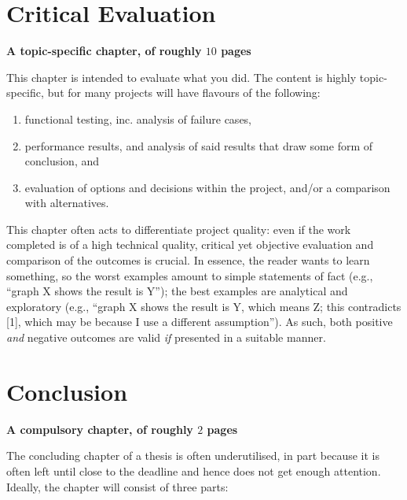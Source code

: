 \documentclass[ %
                    author={Luke Murray},
                supervisor={Dr. Simon Hollis},
                     title={Shadow Peer-to-Peer Networks},
                  subtitle={},
                    degree={MEng},
                      year={2013} ]{thesis}
\begin{document}

\chapter{Critical Evaluation}
\label{chap:evaluation}

{\bf A topic-specific chapter, of roughly $10$ pages} 
\vspace{1cm} 

\noindent
This chapter is intended to evaluate what you did.  The content is highly 
topic-specific, but for many projects will have flavours of the following:

\begin{enumerate}
\item functional testing, inc. analysis of failure cases,
\item performance results, and analysis of said results that draw some 
      form of conclusion,
      and
\item evaluation of options and decisions within the project, and/or a
      comparison with alternatives.
\end{enumerate}

\noindent
This chapter often acts to differentiate project quality: even if the work
completed is of a high technical quality, critical yet objective evaluation 
and comparison of the outcomes is crucial.  In essence, the reader wants to
learn something, so the worst examples amount to simple statements of fact 
(e.g., ``graph X shows the result is Y''); the best examples are analytical 
and exploratory (e.g., ``graph X shows the result is Y, which means Z; this 
contradicts [1], which may be because I use a different assumption'').  As 
such, both positive {\em and} negative outcomes are valid {\em if} presented 
in a suitable manner.


\chapter{Conclusion}
\label{chap:conclusion}

{\bf A compulsory chapter, of roughly $2$ pages} 
\vspace{1cm} 

\noindent
The concluding chapter of a thesis is often underutilised, in part because
it is often left until close to the deadline and hence does not get enough 
attention.  Ideally, the chapter will consist of three parts:
\end{document}
